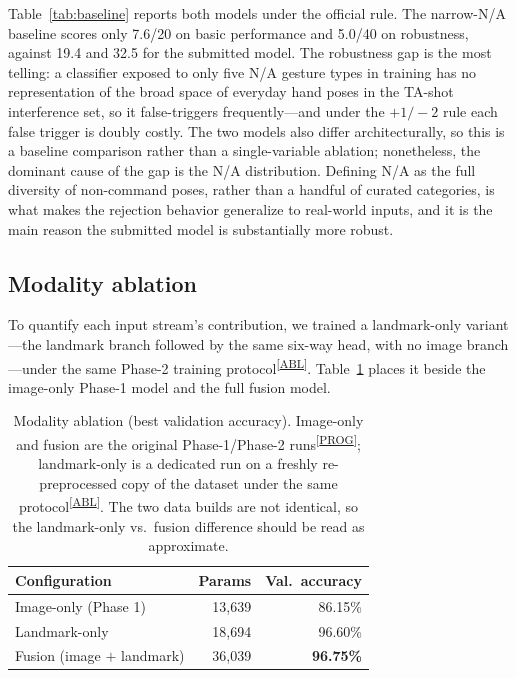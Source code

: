 \documentclass[10pt,twocolumn,a4paper]{article}
\newcommand{\evidence}[1]{\textsuperscript{\scriptsize[\hyperref[ev:#1]{#1}]}}
\begin{document}
Table~\ref{tab:baseline} reports both models under the official rule. The
narrow-N/A baseline scores only 7.6/20 on basic performance and 5.0/40 on
robustness, against 19.4 and 32.5 for the submitted model. The robustness gap
is the most telling: a classifier exposed to only five N/A gesture types in
training has no representation of the broad space of everyday hand poses in the
TA-shot interference set, so it false-triggers frequently---and under the
$+1/-2$ rule each false trigger is doubly costly. The two models also differ
architecturally, so this is a baseline comparison rather than a single-variable
ablation; nonetheless, the dominant cause of the gap is the N/A distribution.
Defining N/A as the full diversity of non-command poses, rather than a handful
of curated categories, is what makes the rejection behavior generalize to
real-world inputs, and it is the main reason the submitted model is
substantially more robust.

\subsection{Modality ablation}
\label{sec:modality}

To quantify each input stream's contribution, we trained a landmark-only
variant---the landmark branch followed by the same six-way head, with no image
branch---under the same Phase-2 training protocol\evidence{ABL}.
Table~\ref{tab:modality} places it beside the image-only Phase-1 model and the
full fusion model.

\begin{table}[t]
  \centering
  \caption{Modality ablation (best validation accuracy). Image-only and fusion
  are the original Phase-1/Phase-2 runs\evidence{PROG}; landmark-only is a
  dedicated run on a freshly re-preprocessed copy of the dataset under the same
  protocol\evidence{ABL}. The two data builds are not identical, so the
  landmark-only vs.\ fusion difference should be read as approximate.}
  \label{tab:modality}
  \small
  \setlength{\tabcolsep}{6pt}
  \begin{tabular}{lrr}
    \toprule
    Configuration & Params & Val.\ accuracy \\
    \midrule
    Image-only (Phase 1)        & 13{,}639 & 86.15\% \\
    Landmark-only               & 18{,}694 & 96.60\% \\
    Fusion (image $+$ landmark) & 36{,}039 & \textbf{96.75\%} \\
    \bottomrule
  \end{tabular}
\end{table}
\end{document}
